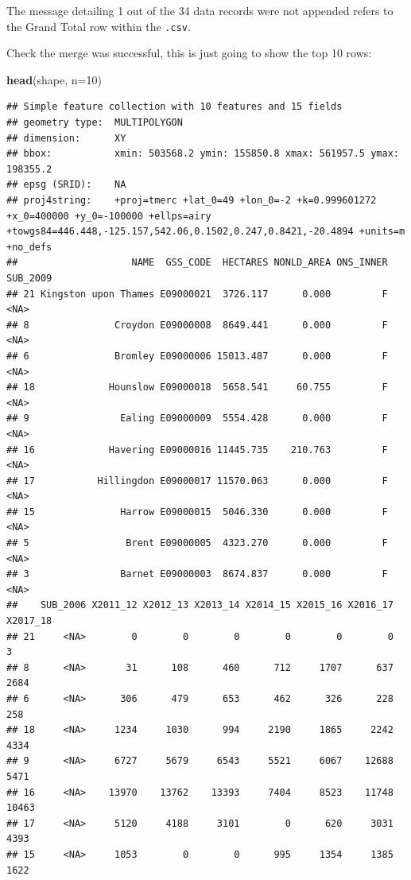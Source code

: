 \documentclass[]{book}
\newenvironment{Shaded}{\begin{snugshade}}{\end{snugshade}}
\newcommand{\DataTypeTok}[1]{\textcolor[rgb]{0.13,0.29,0.53}{#1}}
\newcommand{\DecValTok}[1]{\textcolor[rgb]{0.00,0.00,0.81}{#1}}
\newcommand{\KeywordTok}[1]{\textcolor[rgb]{0.13,0.29,0.53}{\textbf{#1}}}
\newcommand{\NormalTok}[1]{#1}
\begin{document}
The message detailing 1 out of the 34 data records were not appended refers to the Grand Total row within the \texttt{.csv}.

Check the merge was successful, this is just going to show the top 10 rows:

\begin{Shaded}
\begin{Highlighting}[]
\KeywordTok{head}\NormalTok{(shape, }\DataTypeTok{n=}\DecValTok{10}\NormalTok{)}
\end{Highlighting}
\end{Shaded}

\begin{verbatim}
## Simple feature collection with 10 features and 15 fields
## geometry type:  MULTIPOLYGON
## dimension:      XY
## bbox:           xmin: 503568.2 ymin: 155850.8 xmax: 561957.5 ymax: 198355.2
## epsg (SRID):    NA
## proj4string:    +proj=tmerc +lat_0=49 +lon_0=-2 +k=0.999601272 +x_0=400000 +y_0=-100000 +ellps=airy +towgs84=446.448,-125.157,542.06,0.1502,0.247,0.8421,-20.4894 +units=m +no_defs
##                    NAME  GSS_CODE  HECTARES NONLD_AREA ONS_INNER SUB_2009
## 21 Kingston upon Thames E09000021  3726.117      0.000         F     <NA>
## 8               Croydon E09000008  8649.441      0.000         F     <NA>
## 6               Bromley E09000006 15013.487      0.000         F     <NA>
## 18             Hounslow E09000018  5658.541     60.755         F     <NA>
## 9                Ealing E09000009  5554.428      0.000         F     <NA>
## 16             Havering E09000016 11445.735    210.763         F     <NA>
## 17           Hillingdon E09000017 11570.063      0.000         F     <NA>
## 15               Harrow E09000015  5046.330      0.000         F     <NA>
## 5                 Brent E09000005  4323.270      0.000         F     <NA>
## 3                Barnet E09000003  8674.837      0.000         F     <NA>
##    SUB_2006 X2011_12 X2012_13 X2013_14 X2014_15 X2015_16 X2016_17 X2017_18
## 21     <NA>        0        0        0        0        0        0        3
## 8      <NA>       31      108      460      712     1707      637     2684
## 6      <NA>      306      479      653      462      326      228      258
## 18     <NA>     1234     1030      994     2190     1865     2242     4334
## 9      <NA>     6727     5679     6543     5521     6067    12688     5471
## 16     <NA>    13970    13762    13393     7404     8523    11748    10463
## 17     <NA>     5120     4188     3101        0      620     3031     4393
## 15     <NA>     1053        0        0      995     1354     1385     1622

\end{verbatim}
\end{document}

